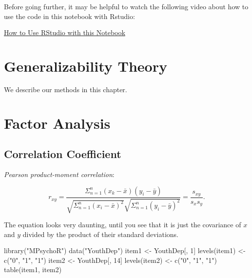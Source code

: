 \documentclass[
]{book}
\newenvironment{Shaded}{\begin{snugshade}}{\end{snugshade}}
\newcommand{\DecValTok}[1]{\textcolor[rgb]{0.00,0.00,0.81}{#1}}
\newcommand{\FunctionTok}[1]{\textcolor[rgb]{0.00,0.00,0.00}{#1}}
\newcommand{\NormalTok}[1]{#1}
\newcommand{\OtherTok}[1]{\textcolor[rgb]{0.56,0.35,0.01}{#1}}
\newcommand{\StringTok}[1]{\textcolor[rgb]{0.31,0.60,0.02}{#1}}
\begin{document}
Before going further, it may be helpful to watch the following video about how to use the code in this notebook with Rstudio:

\href{https://auburn.hosted.panopto.com/Panopto/Pages/Viewer.aspx?id=13acb849-902a-45c7-bc4e-ad870153fcae}{How to Use RStudio with this Notebook}

\hypertarget{generalizability-theory}{%
\chapter{Generalizability Theory}\label{generalizability-theory}}

We describe our methods in this chapter.

\hypertarget{factor-analysis}{%
\chapter{Factor Analysis}\label{factor-analysis}}

\hypertarget{correlation-coefficient}{%
\section{Correlation Coefficient}\label{correlation-coefficient}}

\emph{Pearson product-moment correlation}:

\[
r_{xy} = \frac{\Sigma_{n=1}^n (x_k - \bar{x})(y_i - \bar{y})}{\sqrt{\Sigma_{n=1}^n(x_i - \bar{x})^2} \sqrt{\Sigma_{n=1}^n(y_i - \bar{y})^2}} = \frac{s_{xy}}{s_x s_y}.
\]

The equation looks very daunting, until you see that it is just the covariance of \(x\) and \(y\) divided by the product of their standard deviations.

\begin{Shaded}
\begin{Highlighting}[]
\FunctionTok{library}\NormalTok{(}\StringTok{"MPsychoR"}\NormalTok{)}
\FunctionTok{data}\NormalTok{(}\StringTok{"YouthDep"}\NormalTok{)}
\NormalTok{item1 }\OtherTok{\textless{}{-}}\NormalTok{ YouthDep[, }\DecValTok{1}\NormalTok{]}
\FunctionTok{levels}\NormalTok{(item1) }\OtherTok{\textless{}{-}} \FunctionTok{c}\NormalTok{(}\StringTok{"0"}\NormalTok{, }\StringTok{"1"}\NormalTok{, }\StringTok{"1"}\NormalTok{)}
\NormalTok{item2 }\OtherTok{\textless{}{-}}\NormalTok{ YouthDep[, }\DecValTok{14}\NormalTok{]}
\FunctionTok{levels}\NormalTok{(item2) }\OtherTok{\textless{}{-}} \FunctionTok{c}\NormalTok{(}\StringTok{"0"}\NormalTok{, }\StringTok{"1"}\NormalTok{, }\StringTok{"1"}\NormalTok{)}
\FunctionTok{table}\NormalTok{(item1, item2)}
\end{Highlighting}
\end{Shaded}
\end{document}
